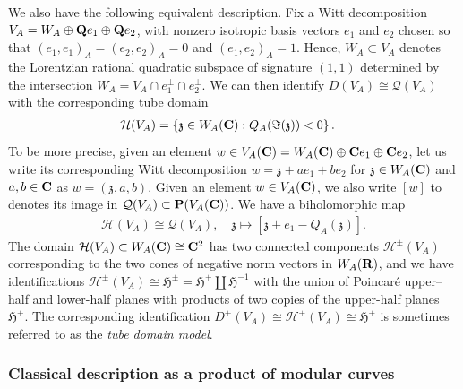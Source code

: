 \documentclass{amsart}
\theoremstyle{definition}
\theoremstyle{definition}
\theoremstyle{definition}
\begin{document}
We also have the following equivalent description. Fix a Witt decomposition $V_A = W_A \oplus {\bf{Q}} e_1 \oplus {\bf{Q}} e_2$,
with nonzero isotropic basis vectors $e_1$ and $e_2$ chosen so that $(e_1,e_1)_A = (e_2, e_2)_A = 0$ and $(e_1, e_2)_A = 1$. 
Hence, $W_A \subset V_A$ denotes the Lorentzian rational quadratic subspace of signature $(1,1)$ determined by the intersection 
$W_A = V_A \cap e_1^{\perp} \cap e_2^{\perp}$. We can then identify $D(V_A) \cong \mathcal{Q}(V_A)$ with the corresponding tube domain
\begin{align*} \mathcal{H}(V_A) &= \left\lbrace \mathfrak{z} \in W_A({\bf{C}}) : Q_A( \Im( \mathfrak{z}) ) < 0  \right\rbrace. \end{align*}
To be more precise, given an element $w \in V_A({\bf{C}}) = W_A ({\bf{C}}) \oplus {\bf{C}} e_1 \oplus {\bf{C}} e_2$, let us write its 
corresponding Witt decomposition $w = \mathfrak{z} + ae_1 + b e_2$ for $\mathfrak{z} \in W_A({\bf{C}})$ and $a, b \in {\bf{C}}$ as $w = (\mathfrak{z}, a, b)$. 
Given an element $w \in V_A({\bf{C}})$, we also write $[w]$ to denotes its image in $\mathcal{Q}(V_A) \subset {\bf{P}}(V_A({\bf{C}}))$.
We have a biholomorphic map 
\begin{align*} \mathcal{H}(V_A) \cong \mathcal{Q}(V_A), \quad \mathfrak{z} \longmapsto \left[ \mathfrak{z} + e_1 -Q_A(\mathfrak{z}) \right]. \end{align*}
The domain $\mathcal{H}(V_A) \subset W_A({\bf{C}}) \cong {\bf{C}}^2$ has two connected components
$\mathcal{H}^{\pm}(V_A)$ corresponding to the two cones of negative norm vectors in $W_A({\bf{R}})$,
and we have identifications $\mathcal{H}^{\pm}(V_A) \cong \mathfrak{H}^{\pm} = \mathfrak{H}^+ \coprod \mathfrak{H}^{-1}$ 
with the union of Poincar\'e upper--half and lower-half planes
with products of two copies of the upper-half planes $\mathfrak{H}^{\pm}$. The corresponding identification 
$D^{\pm}(V_A) \cong \mathcal{H}^{\pm}(V_A) \cong \mathfrak{H}^{\pm}$ is sometimes referred to as the {\it{tube domain model}}.

\subsubsection{Classical description as a product of modular curves}
\end{document}
